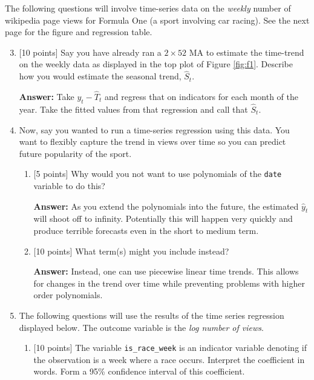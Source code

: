 \documentclass[12pt]{article}
\newcommand{\answer}[1]{{\color{blue_winged_teal}\textbf{Answer:} #1}}
\newcommand{\pts}[1]{{\color{zinc500}[#1 points]}}
\begin{document}
\newpage
The following questions will involve time-series data on the \emph{weekly} number of wikipedia page views for Formula One (a sport involving car racing). 
See the next page for the figure and regression table.

\begin{enumerate}
  \setcounter{enumi}{2}
  \bigskip
  \item \pts{10} Say you have already ran a $2 \times 52$ MA to estimate the time-trend on the weekly data as displayed in the top plot of Figure \ref{fig:f1}. 
  Describe how you would estimate the seasonal trend, $\hat{S}_t$.

  \answer{
    Take $y_t - \hat{T}_t$ and regress that on indicators for each month of the year. 
    Take the fitted values from that regression and call that $\hat{S}_t$.
  }

  \bigskip
  \item Now, say you wanted to run a time-series regression using this data. 
  You want to flexibly capture the trend in views over time so you can predict future popularity of the sport.
  \begin{enumerate}[label=(\alph*)]
    \item \pts{5} Why would you not want to use polynomials of the \texttt{date} variable to do this?
    
    \answer{As you extend the polynomials into the future, the estimated $\hat{y}_t$ will shoot off to infinity. Potentially this will happen very quickly and produce terrible forecasts even in the short to medium term.}
    
    \item \pts{10} What term(s) might you include instead?
    
    \answer{Instead, one can use piecewise linear time trends. This allows for changes in the trend over time while preventing problems with higher order polynomials.}
  \end{enumerate}

  \bigskip
  \item The following questions will use the results of the time series regression displayed below. 
  The outcome variable is the \emph{log number of views}.

  \begin{enumerate}[label=(\alph*)]
    \item \pts{10} The variable \texttt{is\_race\_week} is an indicator variable denoting if the observation is a week where a race occurs. 
    Interpret the coefficient in words.
    Form a 95\% confidence interval of this coefficient.


\end{enumerate}
\end{enumerate}
\end{document}
